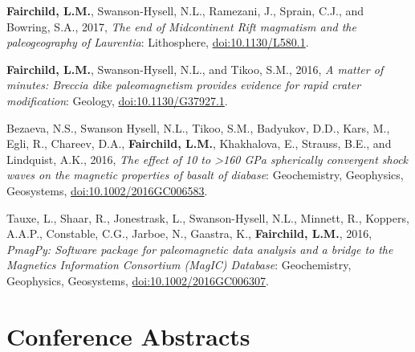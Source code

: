 \documentclass[10pt,a4paper,sans]{moderncv}
\begin{document}
\begin{etaremune}[itemsep=3pt]
 \item{\textbf{Fairchild, L.M.}, Swanson-Hysell, N.L., Ramezani, J., Sprain,
             C.J., and Bowring, S.A., 2017, \textit{The end of Midcontinent Rift
              magmatism and the paleogeography of Laurentia}: Lithosphere,
             {\color{cyan}\href{https://doi.org/10.1130/L580.1}
               {doi:10.1130/L580.1}}.}

 \item{\textbf{Fairchild, L.M.}, Swanson-Hysell, N.L., and Tikoo, S.M., 2016,
             \textit{A matter of minutes: Breccia dike paleomagnetism provides
              evidence for rapid crater modification}: Geology,
             {\color{cyan}\href{https://doi.org/10.1130/G37927.1}
               {doi:10.1130/G37927.1}}.}

 \item{Bezaeva, N.S., Swanson Hysell, N.L., Tikoo, S.M., Badyukov, D.D.,
             Kars, M., Egli, R., Chareev, D.A., \textbf{Fairchild, L.M.},
             Khakhalova, E., Strauss, B.E., and Lindquist, A.K., 2016,
             \textit{The effect of 10 to >160 GPa spherically convergent shock
              waves on the magnetic properties of basalt of diabase}:
             Geochemistry, Geophysics, Geosystems,
             {\color{cyan}\href{https://doi.org/10.1002/2016GC006583}
               {doi:10.1002/2016GC006583}}.}

 \item{Tauxe, L., Shaar, R., Jonestrask, L., Swanson-Hysell, N.L., Minnett,
             R., Koppers, A.A.P., Constable, C.G., Jarboe, N., Gaastra,  K.,
             \textbf{Fairchild, L.M.}, 2016, \textit{PmagPy: Software package for
              paleomagnetic data analysis and a bridge to the Magnetics
              Information Consortium (MagIC) Database}: Geochemistry,
             Geophysics, Geosystems,
             {\color{cyan}\href{https://doi.org/10.1002/2016GC006307}
               {doi:10.1002/2016GC006307}}.}

\end{etaremune}

\section{Conference Abstracts}
\end{document}
